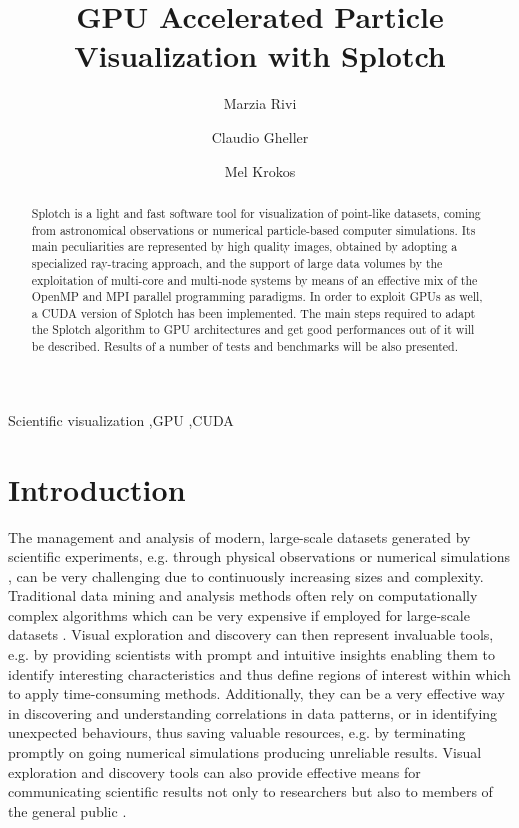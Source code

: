 \documentclass[1p]{elsarticle}
\begin{document}
\begin{frontmatter}

\title{GPU Accelerated Particle Visualization with Splotch}
\author[1]{Marzia Rivi} 
\address[1]{Department of Physics, University of Oxford, Keble Road, OX1 3RH Oxford, United Kingdom}
\author[2]{Claudio Gheller}
\address[2]{ETH-CSCS, via Trevano 131, 6900 Lugano, Switzerland}
\author[3]{Mel Krokos}
\address[3]{...  University of Portsmouth, ...}

\begin{abstract}
Splotch is a light and fast software tool for visualization of point-like datasets, coming from astronomical observations or numerical particle-based computer simulations. Its main peculiarities are represented by high quality images, obtained by adopting a specialized ray-tracing approach, and the support of large data volumes by the exploitation of multi-core and multi-node systems by means of an effective mix of the OpenMP and MPI parallel programming paradigms. In order to exploit GPUs as well, a CUDA version of Splotch has been implemented. The main steps required to adapt the Splotch algorithm to GPU architectures and get good performances out of it will be described. Results of a number of tests and benchmarks will be also presented. 
\end{abstract}

\begin{keyword}
Scientific visualization \sep GPU \sep CUDA
\end{keyword}

\end{frontmatter}

\section{Introduction}
\label{sec:intro}

The management and analysis of modern, large-scale datasets generated by scientific experiments, e.g. through physical observations \cite{} or numerical simulations \cite{}, can be very challenging due to continuously increasing sizes and complexity. Traditional data mining and analysis methods often rely on computationally complex
algorithms \cite{} which can be very expensive if employed for 
large-scale datasets \cite{}. Visual exploration and discovery can then represent invaluable tools, e.g. by providing scientists with prompt and intuitive insights enabling them to identify interesting characteristics and thus define regions of interest within which
to apply time-consuming methods. Additionally, they can be a very effective way in discovering and understanding correlations in data patterns, or in identifying unexpected behaviours, thus saving valuable resources, e.g. by terminating promptly on going numerical simulations producing unreliable results. Visual exploration and discovery tools can also provide effective means for communicating scientific results not only to researchers \cite{} but also to members of the general public \cite{}.
\end{document}

